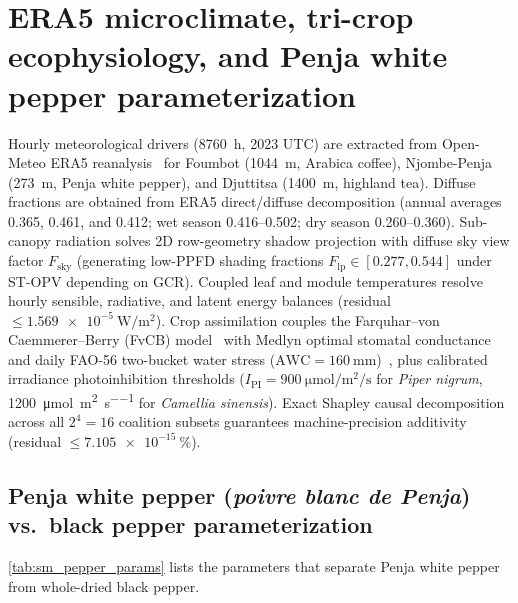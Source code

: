 \documentclass[preprint,12pt,a4paper]{elsarticle}
\begin{document}
\section{ERA5 microclimate, tri-crop ecophysiology, and Penja white pepper parameterization}
\label{sec:sm_agro}

Hourly meteorological drivers (\qty{8760}{\hour}, 2023 UTC) are extracted from Open-Meteo ERA5 reanalysis~\cite{Hersbach2020} for Foumbot (\qty{1044}{\meter}, Arabica coffee), Njombe-Penja (\qty{273}{\meter}, Penja white pepper), and Djuttitsa (\qty{1400}{\meter}, highland tea). Diffuse fractions are obtained from ERA5 direct/diffuse decomposition (annual averages \num{0.365}, \num{0.461}, and \num{0.412}; wet season \numrange{0.416}{0.502}; dry season \numrange{0.260}{0.360}). Sub-canopy radiation solves 2D row-geometry shadow projection with diffuse sky view factor $F_{\mathrm{sky}}$ (generating low-PPFD shading fractions $F_{\mathrm{lp}} \in [\num{0.277}, \num{0.544}]$ under ST-OPV depending on $\mathrm{GCR}$). Coupled leaf and module temperatures resolve hourly sensible, radiative, and latent energy balances (residual $\le \qty{1.569e-5}{\watt\per\square\meter}$). Crop assimilation couples the Farquhar--von Caemmerer--Berry (FvCB) model~\cite{Farquhar1980} with Medlyn optimal stomatal conductance~\cite{Medlyn2011} and daily FAO-56 two-bucket water stress ($\mathrm{AWC}=\qty{160}{\milli\meter}$)~\cite{Allen1998}, plus calibrated irradiance photoinhibition thresholds ($I_{\mathrm{PI}} = \qty{900}{\micro\mole\per\square\meter\per\second}$ for \textit{Piper nigrum}, \qty{1200}{\micro\mole\per\square\meter\per\second} for \textit{Camellia sinensis}). Exact Shapley causal decomposition across all $2^4=16$ coalition subsets guarantees machine-precision additivity (residual $\le \qty{7.105e-15}{\percent}$).

\subsection{Penja white pepper (\textit{poivre blanc de Penja}) vs.\ black pepper parameterization}
\cref{tab:sm_pepper_params} lists the parameters that separate Penja white pepper from whole-dried black pepper.
\end{document}
